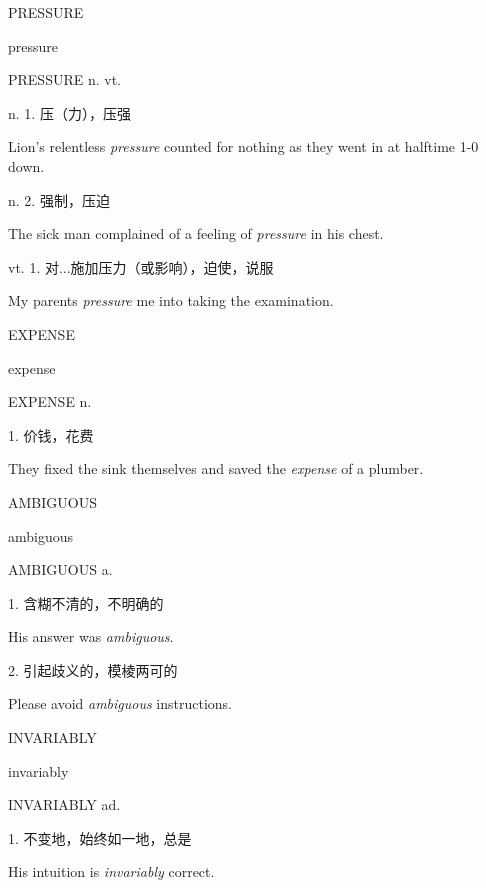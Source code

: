 \begin{flashcard}{
PRESSURE

pressure
}
\begin{center}
PRESSURE n. vt. 
\end{center}
n. 1. 压（力），压强

Lion's relentless \textit{pressure} counted for nothing as they went in at halftime 1-0 down.

n. 2. 强制，压迫

The sick man complained of a feeling of \textit{pressure} in his chest.

vt. 1. 对...施加压力（或影响），迫使，说服

My parents \textit{pressure} me into taking the examination.

\end{flashcard}
\begin{flashcard}{
EXPENSE

expense
}
\begin{center}
EXPENSE n. 
\end{center}
1. 价钱，花费

They fixed the sink themselves and saved the \textit{expense} of a plumber.

\end{flashcard}
\begin{flashcard}{
AMBIGUOUS

ambiguous
}
\begin{center}
AMBIGUOUS a. 
\end{center}
1. 含糊不清的，不明确的

His answer was \textit{ambiguous}.

2. 引起歧义的，模棱两可的

Please avoid \textit{ambiguous} instructions.

\end{flashcard}
\begin{flashcard}{
INVARIABLY

invariably
}
\begin{center}
INVARIABLY ad. 
\end{center}
1. 不变地，始终如一地，总是

His intuition is \textit{invariably} correct.

\end{flashcard}
